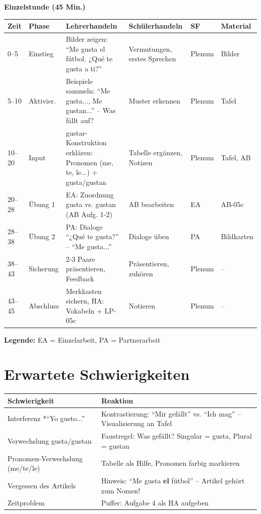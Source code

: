 \documentclass[11pt,a4paper]{article}
\begin{document}
\textbf{Einzelstunde (45 Min.)}

\begin{longtable}{|p{1cm}|p{1.5cm}|p{4cm}|p{3cm}|p{1.5cm}|p{2cm}|}
\hline
\textbf{Zeit} & \textbf{Phase} & \textbf{Lehrerhandeln} & \textbf{Schülerhandeln} & \textbf{SF} & \textbf{Material} \\
\hline
\endhead

0--5 & Einstieg & Bilder zeigen: ``Me gusta el fútbol. ¿Qué te gusta a ti?'' & Vermutungen, erstes Sprechen & Plenum & Bilder \\
\hline

5--10 & Aktivier. & Beispiele sammeln: ``Me gusta..., Me gustan...'' -- Was fällt auf? & Muster erkennen & Plenum & Tafel \\
\hline

10--20 & Input & gustar-Konstruktion erklären: Pronomen (me, te, le...) + gusta/gustan & Tabelle ergänzen, Notizen & Plenum & Tafel, AB \\
\hline

20--28 & Übung 1 & EA: Zuordnung gusta vs. gustan (AB Aufg. 1-2) & AB bearbeiten & EA & AB-05c \\
\hline

28--38 & Übung 2 & PA: Dialoge ``¿Qué te gusta?'' -- ``Me gusta...'' & Dialoge üben & PA & Bildkarten \\
\hline

38--43 & Sicherung & 2-3 Paare präsentieren, Feedback & Präsentieren, zuhören & Plenum & -- \\
\hline

43--45 & Abschluss & Merkkasten sichern, HA: Vokabeln + LP-05c & Notieren & Plenum & -- \\
\hline
\end{longtable}

\textbf{Legende:} EA = Einzelarbeit, PA = Partnerarbeit

\section{Erwartete Schwierigkeiten}

\begin{tabular}{|p{4.5cm}|p{8cm}|}
\hline
\textbf{Schwierigkeit} & \textbf{Reaktion} \\
\hline
Interferenz *``Yo gusto...'' & Kontrastierung: ``Mir gefällt'' vs. ``Ich mag'' -- Visualisierung an Tafel \\
\hline
Verwechslung gusta/gustan & Faustregel: Was gefällt? Singular = gusta, Plural = gustan \\
\hline
Pronomen-Verwechslung (me/te/le) & Tabelle als Hilfe, Pronomen farbig markieren \\
\hline
Vergessen des Artikels & Hinweis: ``Me gusta \textbf{el} fútbol'' -- Artikel gehört zum Nomen! \\
\hline
Zeitproblem & Puffer: Aufgabe 4 als HA aufgeben \\
\hline
\end{tabular}
\end{document}
